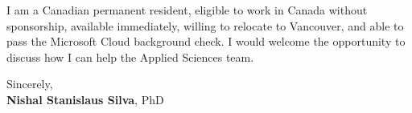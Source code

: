 \documentclass[11pt]{article}
\newcommand{\clName}{Nishal Stanislaus Silva}
\newcommand{\clTeam}{the Applied Sciences team}
\begin{document}
I am a Canadian permanent resident, eligible to work in Canada without sponsorship, available immediately, willing to relocate to Vancouver, and able to pass the Microsoft Cloud background check. I would welcome the opportunity to discuss how I can help \clTeam{}.

\vspace{8pt}
Sincerely,\\[2pt]
\textbf{\clName}, PhD
\end{document}
